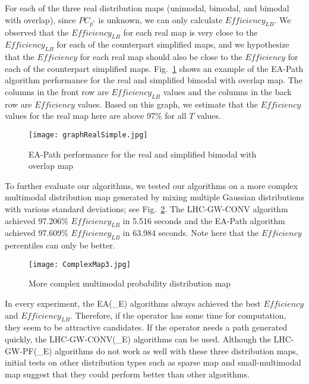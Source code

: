 \documentclass[letterpaper, 10 pt, conference]{ieeeconf}
\begin{document}
For each of the three real distribution maps (unimodal, bimodal, and bimodal with overlap), since $PC_{p^*}$ is unknown, we can only calculate $\mathit{Efficiency_{LB}}$. We observed that the $\mathit{Efficiency_{LB}}$ for each real map is very close to the $\mathit{Efficiency_{LB}}$ for each of the counterpart simplified maps, and we hypothesize that the $\mathit{Efficiency}$ for each real map should also be close to the $\mathit{Efficiency}$ for each of the counterpart simplified maps. Fig.~\ref{graphRealSimple} shows an example of the EA-Path algorithm performance for the real and simplified bimodal with overlap map. The columns in the front row are $\mathit{Efficiency_{LB}}$ values and the columns in the back row are $\mathit{Efficiency}$ values. Based on this graph, we estimate that the $\mathit{Efficiency}$ values for the real map here are above 97\% for all $T$ values.

\begin{figure}
\vspace*{-3ex}
\centering
\texttt{[image: graphRealSimple.jpg]}
\caption{EA-Path performance for the real and simplified bimodal with overlap map}
\label{graphRealSimple}
\end{figure}

To further evaluate our algorithms, we tested our algorithms on a more complex multimodal distribution map generated by mixing multiple Gaussian distributions with various standard deviations; see Fig.~\ref{ComplexMap}. The LHC-GW-CONV algorithm achieved 97.206\% $\mathit{Efficiency_{LB}}$ in 5.516 seconds and the EA-Path algorithm achieved 97.609\% $\mathit{Efficiency_{LB}}$ in 63.984 seconds. Note here that the $\mathit{Efficiency}$ percentiles can only be better.

\begin{figure}
\centering
\texttt{[image: ComplexMap3.jpg]}
\caption{More complex multimodal probability distribution map}
\label{ComplexMap}
\vspace*{-3ex}
\end{figure}

In every experiment, the EA(\_E) algorithms always achieved the best $\mathit{Efficiency}$ and $\mathit{Efficiency_{LB}}$. Therefore, if the operator has some time for computation, they seem to be attractive candidates. If the operator needs a path generated quickly, the LHC-GW-CONV(\_E) algorithms can be used. Although the LHC-GW-PF(\_E) algorithms do not work as well with these three distribution maps, initial tests on other distribution types such as sparse map and small-multimodal map suggest that they could perform better than other algorithms.
\end{document}
